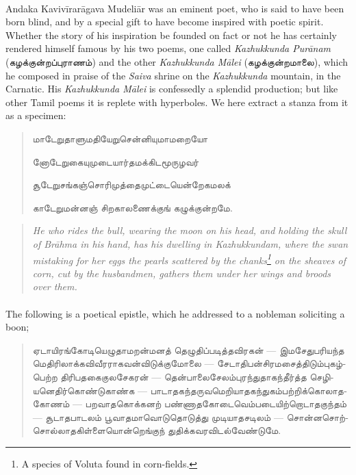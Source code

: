 \documentclass{article}
\newcommand{\TamilText}[1]{\texttamil{#1}}
\newcommand{\tam}[1]{\TamilText{#1}}
\begin{document}
\paragraph{}
Andaka Kaviv\={i}rar\={a}gava Mudeli\={a}r was an eminent poet, who is said to have been born blind, and by a special gift to have become inspired with poetic spirit. Whether the story of his inspiration be founded on fact or not he has certainly rendered himself famous by his two poems, one called \emph{Kazhukkunda Pur\={a}nam} (\tam{கழக்குன்றப்புராணம்}) and the other \emph{Kazhukkunda M\={a}lei} (\tam{கழக்குன்றமாலை}), which he composed in praise of the \emph{Saiva} shrine on the \emph{Kazhukkunda} mountain, in the Carnatic. His \emph{Kazhukkunda M\={a}lei} is confessedly a splendid production; but like other Tamil poems it is replete with hyperboles. We here extract a stanza from it as a specimen: 
\begin{quotation}\small
\tam{மாடேறுதாளுமதியேறுசென்னியுமாமறையோ}

\tam{னோடேறுகையுமுடையார்தமக்கிடமூருழவர்‌}

\tam{சூடேறுசங்கஞ்சொரிமுத்தைமுட்டையென்றேகமலக்‌}

\tam{காடேறுமன்னஞ்‌ சிறகாலணைக்குங்‌ கழுக்குன்றமே}.
\end{quotation}
\begin{quotation}\small
\emph{He who rides the bull, wearing the moon on his head, and holding the skull of Br\={a}hma in his hand, has his dwelling in Kazhukkundam, where the swan mistaking for her eggs the pearls scattered by the chanks\footnote{A species of Voluta found in corn-fields.} on the sheaves of corn, cut by the husbandmen, gathers them under her wings and broods over them.}
\end{quotation}
\paragraph{}
The following is a poetical epistle, which he addressed to a nobleman soliciting a boon;
\begin{quotation}\small
\tam{ஏடாயிரங்கோடியெழுதாமறன்மனத்‌ தெழுதிப்படித்தவிரகன்‌} --- \tam{இமசேதுபரியந்த மெதிரிலாக்கவிவீரராகவன்விடுக்குமோலை} --- \tam{சேடாதிபன்சிரமசைத்திடும்புகழ்பெற்ற திரிபதகைகுலசேகரன்‌} --- \tam{தென்பாலைசேலம்புரந்துதாகந்தீர்த்த செழியனெதிர்கொண்டுகாண்க} --- \tam{பாடாதகந்தருவமெறியாதகந்துகம்பற்றிக்கொலாதகோணம்‌} --- \tam{பறவாதகொக்‌கனற்‌ பண்ணாதகோடைவெம்படையிற்றொடாதகுந்தம்‌} --- \tam{சூடாதபாடலம்‌ பூவாதமாவொடுதொடுத்து முடியாதசடிலம்‌} --- \tam{சொன்னசொற்‌சொல்லாதகிள்ளையொன்றெங்குந் துதிக்கவரவிடல்வேண்டுமே}.
\end{quotation}
\end{document}
